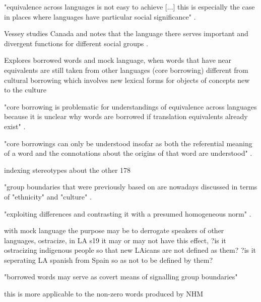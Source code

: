 "equivalence across languages is not easy to achieve [...] this is especially the case in places where languages have particular social significance" \cite[177]{Vessey2014}.

Vessey studies Canada and notes that the language there serves important and divergent functions for different social groups \cite[177]{Vessey2014}.

Explores borrowed words and mock language, when words that have near equivalents are still taken from other languages (core borrowing) different from cultural borrowing which involves new lexical forms for objects of concepts new to the culture

"core borrowing is problematic for understandings of equivalence across languages because it is unclear why words are borrowed if translation equivalents already exist" \cite[177]{Vessey2014}.


"core borrowings can only be understood insofar as both the referential meaning of a word and the connotations about the origins of that word are understood" \cite[177]{Vessey2014}.



indexing stereotypes about the other 178

"group boundaries that were previously based on are nowadays discussed in terms of "ethnicity" and "culture" \cite[178]{Vessey2014}.


"exploiting differences and contrasting it with a presumed homogeneous norm" \cite[178]{Vessey2014}.

with mock language the purpose may be to derrogate speakers of other languages, ostracize, in LA s19 it may or may not have this effect, ?is it ostracizing indigenous people so that new LAicans are not defined as them? ?is it seperating LA spanish from Spain so as not to be defined by them?



"borrowed words may serve as covert means of signalling group boundaries" \cite[182]{Vessey2014}

this is more applicable to the non-zero words produced by NHM 